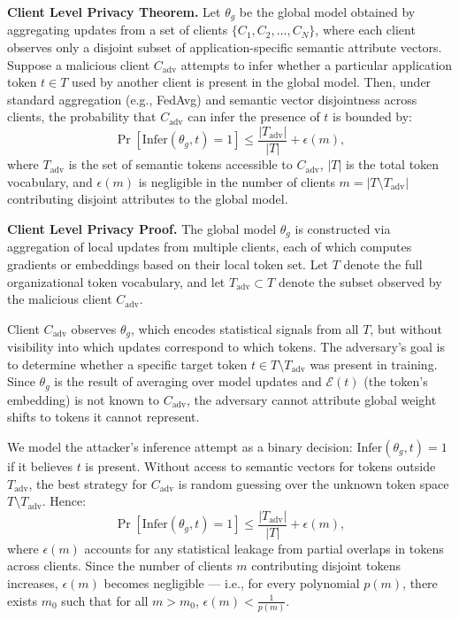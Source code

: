 \textbf{Client Level Privacy Theorem.}  
Let \(\theta_g\) be the global model obtained by aggregating updates from a set of clients \(\{C_1, C_2, \ldots, C_N\}\), where each client observes only a disjoint subset of application-specific semantic attribute vectors. Suppose a malicious client \(C_{\text{adv}}\) attempts to infer whether a particular application token \(t \in T\) used by another client is present in the global model. Then, under standard aggregation (e.g., FedAvg) and semantic vector disjointness across clients, the probability that \(C_{\text{adv}}\) can infer the presence of \(t\) is bounded by:
\[
\Pr[\text{Infer}(\theta_g, t) = 1] \leq \frac{|T_{\text{adv}}|}{|T|} + \epsilon(m),
\]
where \(T_{\text{adv}}\) is the set of semantic tokens accessible to \(C_{\text{adv}}\), \(|T|\) is the total token vocabulary, and \(\epsilon(m)\) is negligible in the number of clients \(m = |T \setminus T_{\text{adv}}|\) contributing disjoint attributes to the global model.

\textbf{Client Level Privacy Proof.}  
The global model \(\theta_g\) is constructed via aggregation of local updates from multiple clients, each of which computes gradients or embeddings based on their local token set. Let \(T\) denote the full organizational token vocabulary, and let \(T_{\text{adv}} \subset T\) denote the subset observed by the malicious client \(C_{\text{adv}}\).

Client \(C_{\text{adv}}\) observes \(\theta_g\), which encodes statistical signals from all \(T\), but without visibility into which updates correspond to which tokens. The adversary’s goal is to determine whether a specific target token \(t \in T \setminus T_{\text{adv}}\) was present in training. Since \(\theta_g\) is the result of averaging over model updates and \(\mathcal{E}(t)\) (the token's embedding) is not known to \(C_{\text{adv}}\), the adversary cannot attribute global weight shifts to tokens it cannot represent.

We model the attacker’s inference attempt as a binary decision: \(\text{Infer}(\theta_g, t) = 1\) if it believes \(t\) is present. Without access to semantic vectors for tokens outside \(T_{\text{adv}}\), the best strategy for \(C_{\text{adv}}\) is random guessing over the unknown token space \(T \setminus T_{\text{adv}}\). Hence:
\[
\Pr[\text{Infer}(\theta_g, t) = 1] \leq \frac{|T_{\text{adv}}|}{|T|} + \epsilon(m),
\]
where \(\epsilon(m)\) accounts for any statistical leakage from partial overlaps in tokens across clients. Since the number of clients \(m\) contributing disjoint tokens increases, \(\epsilon(m)\) becomes negligible — i.e., for every polynomial \(p(m)\), there exists \(m_0\) such that for all \(m > m_0\), \(\epsilon(m) < \frac{1}{p(m)}\).

